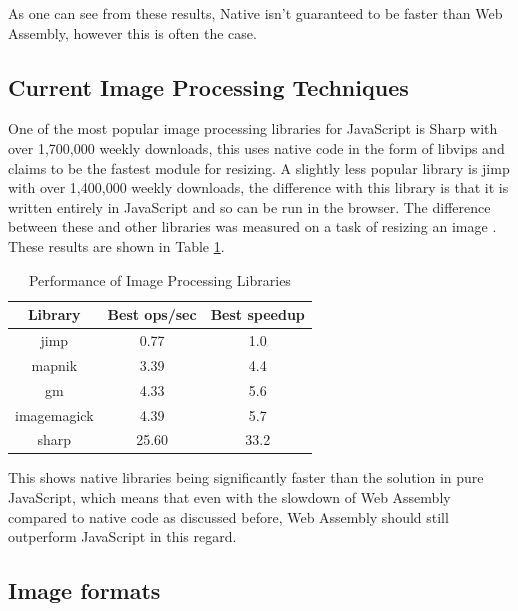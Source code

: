 \documentclass[12pt,a4paper]{article}
\begin{document}
As one can see from these results, Native isn't guaranteed to be faster than Web Assembly, however this is often the case.



\subsection{Current Image Processing Techniques}

One of the most popular image processing libraries for JavaScript is Sharp with over 1,700,000 weekly downloads, this uses native code in the form of libvips and claims to be the fastest module for resizing. A slightly less popular library is jimp with over 1,400,000 weekly downloads, the difference with this library is that it is written entirely in JavaScript and so can be run in the browser. The difference between these and other libraries was measured on a task of resizing an image \cite{sharp}. These results are shown in Table \ref{imgproc}.

\begin{table}[htb]
    \centering
    \caption{Performance of Image Processing Libraries}
    \vspace*{6pt}
    \label{imgproc}
    \begin{tabular}{ccc}\hline\hline
        Library     & Best ops/sec & Best speedup \\ \hline
        jimp        & 0.77         & 1.0          \\
        mapnik      & 3.39         & 4.4          \\
        gm          & 4.33         & 5.6          \\
        imagemagick & 4.39         & 5.7          \\
        sharp       & 25.60        & 33.2
    \end{tabular}
\end{table}


This shows native libraries being significantly faster than the solution in pure JavaScript, which means that even with the slowdown of Web Assembly compared to native code as discussed before, Web Assembly should still outperform JavaScript in this regard.

\subsection{Image formats}
\end{document}
